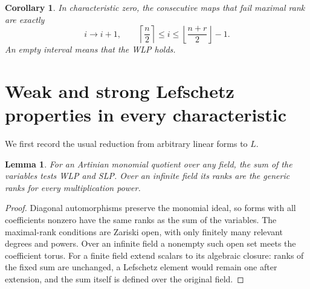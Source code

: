 \documentclass[11pt]{article}
\newtheorem{lemma}[theorem]{Lemma}
\newtheorem{corollary}[theorem]{Corollary}
\theoremstyle{remark}
\begin{document}
\begin{corollary}\label{cor:degrees}
In characteristic zero, the consecutive maps that fail maximal rank are exactly
\[
 i\longrightarrow i+1,
 \qquad \left\lceil\frac n2\right\rceil
 \leq i\leq\left\lfloor\frac{n+r}{2}\right\rfloor-1.
\]
An empty interval means that the WLP holds.
\end{corollary}

\section{Weak and strong Lefschetz properties in every characteristic}
We first record the usual reduction from arbitrary linear forms to $L$.
\begin{lemma}\label{lem:generic}
For an Artinian monomial quotient over any field, the sum of the variables tests WLP and SLP. Over an infinite field its ranks are the generic ranks for every multiplication power.
\end{lemma}
\begin{proof}
Diagonal automorphisms preserve the monomial ideal, so forms with all coefficients nonzero have the same ranks as the sum of the variables. The maximal-rank conditions are Zariski open, with only finitely many relevant degrees and powers. Over an infinite field a nonempty such open set meets the coefficient torus. For a finite field extend scalars to its algebraic closure: ranks of the fixed sum are unchanged, a Lefschetz element would remain one after extension, and the sum itself is defined over the original field.
\end{proof}
\end{document}
